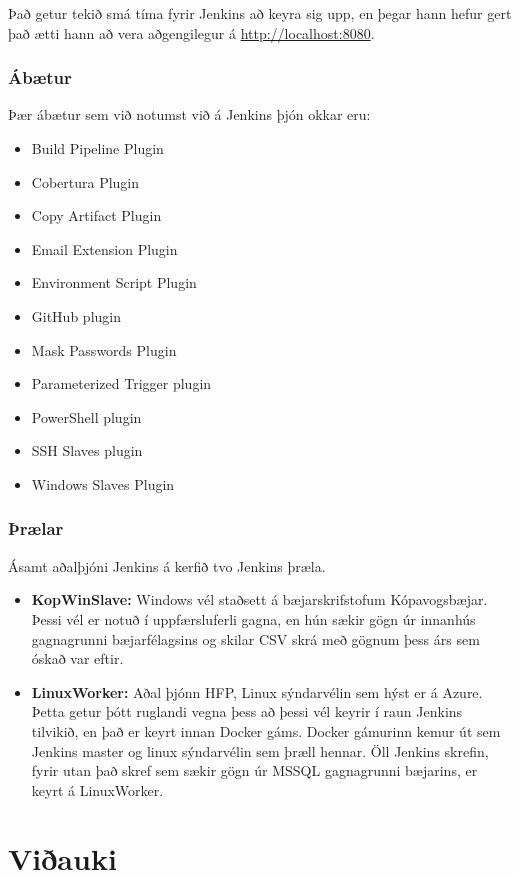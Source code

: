 \documentclass{article}
\theoremstyle{blueP}
\theoremstyle{greenS}
\begin{document}
\noindent Það getur tekið smá tíma fyrir Jenkins að keyra sig upp, en þegar hann hefur gert það ætti hann að vera aðgengilegur á \url{http://localhost:8080}.

\subsubsection{Ábætur}
Þær ábætur sem við notumst við á Jenkins þjón okkar eru:
\begin{itemize}
    \item Build Pipeline Plugin
    \item Cobertura Plugin
    \item Copy Artifact Plugin
    \item Email Extension Plugin
    \item Environment Script Plugin
    \item GitHub plugin
    \item Mask Passwords Plugin
    \item Parameterized Trigger plugin
    \item PowerShell plugin
    \item SSH Slaves plugin
    \item Windows Slaves Plugin
\end{itemize}

\subsubsection{Þrælar}
Ásamt aðalþjóni Jenkins á kerfið tvo Jenkins þræla.
\begin{itemize}
    \item \textbf{KopWinSlave:} Windows vél staðsett á bæjarskrifstofum Kópavogsbæjar. Þessi vél er notuð í uppfærsluferli gagna, en hún sækir gögn úr innanhús gagnagrunni bæjarfélagsins og skilar CSV skrá með gögnum þess árs sem óskað var eftir.
    \item \textbf{LinuxWorker:} Aðal þjónn HFP, Linux sýndarvélin sem hýst er á Azure. Þetta getur þótt ruglandi vegna þess að þessi vél keyrir í raun Jenkins tilvikið, en það er keyrt innan Docker gáms. Docker gámurinn kemur út sem Jenkins master og linux sýndarvélin sem þræll hennar. Öll Jenkins skrefin, fyrir utan það skref sem sækir gögn úr MSSQL gagnagrunni bæjarins, er keyrt á LinuxWorker.
\end{itemize}

\clearpage
\section{\Large Viðauki}
\end{document}
